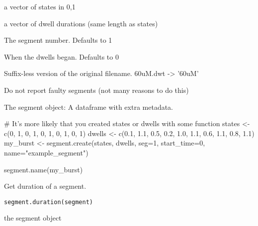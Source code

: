 \documentclass[letterpaper]{book}
\begin{document}
\begin{Arguments}
\begin{ldescription}
\item[\code{states}] a vector of states in 0,1

\item[\code{dwells}] a vector of dwell durations (same length as states)

\item[\code{seg}] The segment number. Defaults to 1

\item[\code{start\_time}] When the dwells began. Defaults to 0

\item[\code{name}] Suffix-less version of the original filename. 60uM.dwt -> '60uM'

\item[\code{ignore\_errors}] Do not report faulty segments (not many reasons to do this)
\end{ldescription}
\end{Arguments}
%
\begin{Value}
The segment object: A dataframe with extra metadata.
\end{Value}
%
\begin{Examples}
\begin{ExampleCode}

# It's more likely that you created states or dwells with some function
states  <-  c(0,      1,    0,    1,    0,    1,    0,    1,    0,    1)
dwells  <-  c(0.1,  1.1,  0.5,  0.2,  1.0,  1.1,  0.6,  1.1,  0.8,  1.1)
my_burst <- segment.create(states, dwells, seg=1, start_time=0, name="example_segment")

segment.name(my_burst)

\end{ExampleCode}
\end{Examples}
%
\begin{Description}\relax
Get duration of a segment.
\end{Description}
%
\begin{Usage}
\begin{verbatim}
segment.duration(segment)
\end{verbatim}
\end{Usage}
%
\begin{Arguments}
\begin{ldescription}
\item[\code{segment}] the segment object
\end{ldescription}
\end{Arguments}
\end{document}
